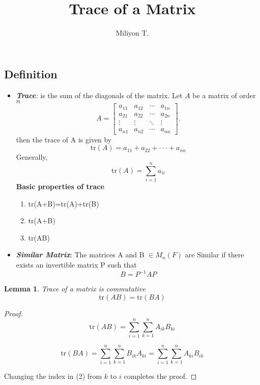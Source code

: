 \documentclass[12pt]{article}
\newtheorem{lem}[thm]{Lemma}
\begin{document}
\nocite{}

\title{\textbf{Trace of a Matrix}}

\author{Miliyon T.}
\maketitle


\section*{}

\subsection*{Definition}

\begin{itemize}
\item \emph{\textbf{Trace}:} is the sum of the diagonals of the matrix. Let $A$ be a matrix of order $n$
$$
  A = \left[
    \begin{matrix}
      a_{11} & a_{12} &   \cdots & a_{1n} \\
      a_{21} & a_{22} &   \cdots & a_{2n} \\
      \vdots & \vdots &   \ddots & \vdots \\
      a_{n1} & a_{n2} & \cdots & a_{nn}
    \end{matrix}
    \right].
    $$
then the trace of A is given by
$$ \mbox{tr}(A)=a_{11}+a_{22}+\cdot\cdot\cdot+a_{nn}$$
Generally,
$$
 \mbox{tr}(A)=\sum_{i=1}^n a_{ii}
$$
\textmd{\textbf{Basic properties of trace}}
 \begin{enumerate}
           \item \mbox{tr}(A+B)=\mbox{tr}(A)+\mbox{tr}(B)
           \item \mbox{tr}(A+B)
           \item \mbox{tr}(AB)
 \end{enumerate}


\item \emph{\textbf{Similar Matrix}}: The matrices A and B $\in M_n(F)$ are Similar if there exists an invertible matrix P such that
$$B=P^{-1}AP$$

\end{itemize}


\begin{lem}
  Trace of a matrix is commutative
  $$
  \mbox{tr}(AB)=\mbox{tr}(BA)
  $$
\end{lem}

\begin{proof}
\begin{equation}
\mbox{tr}(AB)=\sum_{i=1}^n\sum_{k=1}^n A_{ik}B_{ki}
\end{equation}

\begin{equation}
\mbox{tr}(BA)=\sum_{i=1}^n\sum_{k=1}^n B_{ik}A_{ki}=\sum_{i=1}^n\sum_{k=1}^n A_{ki}B_{ik}
\end{equation}

Changing the index in (2) from $k$ to $i$ completes the proof.

\end{proof}
\end{document}
